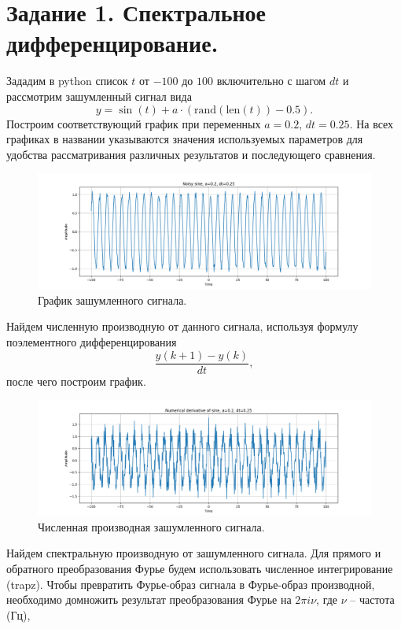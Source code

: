 \documentclass[a4paper, 12pt]{article}
\begin{document}
    \section{Задание 1. Спектральное дифференцирование.}
    Зададим в python список $t$ от $-100$ до $100$ включительно с шагом $dt$ и рассмотрим зашумленный сигнал вида $$y=\sin{(t)}+a\cdot(\text{rand}(\text{len}(t))-0.5).$$
    Построим соответствующий график при переменных $a=0.2,\,dt=0.25$. На всех графиках в названии указываются значения используемых параметров для удобства рассматривания
    различных результатов и последующего сравнения.
    \begin{figure}[H]
        \centering
        \includegraphics[scale=0.4]{1_noisy_sine.png}
        \captionsetup{skip=0pt}
        \caption{График зашумленного сигнала.}
        \label{fig:1ns}
    \end{figure}
    Найдем численную производную от данного сигнала, используя формулу поэлементного дифференцирования $$\dfrac{y(k+1)-y(k)}{dt},$$ после чего построим график.
    \begin{figure}[H]
        \centering
        \includegraphics[scale=0.4]{1_numdiff_sine.png}
        \captionsetup{skip=0pt}
        \caption{Численная производная зашумленного сигнала.}
        \label{fig:1nds}
    \end{figure}
    Найдем спектральную производную от зашумленного сигнала. Для прямого и обратного преобразования Фурье будем использовать численное интегрирование (trapz). Чтобы
    превратить Фурье-образ сигнала в Фурье-образ производной, необходимо домножить результат преобразования Фурье на $2\pi i \nu$, где $\nu$ -- частота (Гц),
\end{document}

